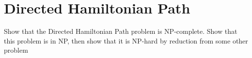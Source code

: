 \documentclass[12pt]{article}
\begin{document}
\section{Directed Hamiltonian Path}\label{hamiltonian path}
Show that the Directed Hamiltonian Path problem is NP-complete. Show that this problem is in NP, then show that it is NP-hard by reduction from some other problem
\begin{addmargin}[2em]{2em}

\end{addmargin}
\end{document}
